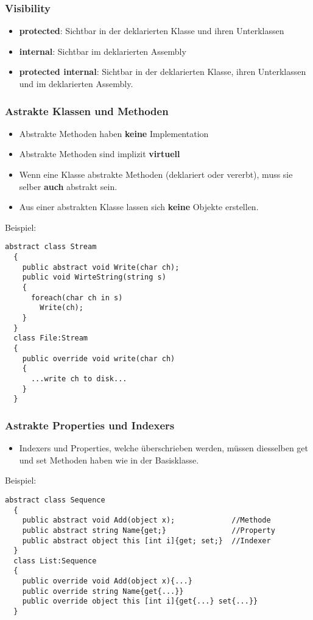 \subsubsection{Visibility}
\begin{itemize}
  \item \textbf{protected}: Sichtbar in der deklarierten Klasse und ihren
  Unterklassen
  \item \textbf{internal}: Sichtbar im deklarierten Assembly
  \item \textbf{protected internal}: Sichtbar in der deklarierten Klasse, ihren
  Unterklassen und im deklarierten Assembly. 
\end{itemize}

\subsubsection{Astrakte Klassen und Methoden}
\begin{itemize}
  \item Abstrakte Methoden haben \textbf{keine} Implementation
  \item Abstrakte Methoden sind implizit \textbf{virtuell}
  \item Wenn eine Klasse abstrakte Methoden (deklariert oder vererbt), muss sie
  selber \textbf{auch} abstrakt sein. 
  \item Aus einer abstrakten Klasse lassen sich \textbf{keine} Objekte
  erstellen. 
\end{itemize}
Beispiel: 
\begin{lstlisting}[style=Csharp]
  abstract class Stream
  {
    public abstract void Write(char ch);
    public void WirteString(string s)
    {
      foreach(char ch in s) 
        Write(ch); 
    }
  }
  class File:Stream
  {
    public override void write(char ch)
    {
      ...write ch to disk...
    }
  }
\end{lstlisting}

\subsubsection{Astrakte Properties und Indexers}
\begin{itemize}
  \item Indexers und Properties, welche überschrieben werden, müssen diesselben
  get und set Methoden haben wie in der Basisklasse.
\end{itemize}
Beispiel: 
\begin{lstlisting}[style=Csharp]
  abstract class Sequence
  {
    public abstract void Add(object x);             //Methode
    public abstract string Name{get;}               //Property
    public abstract object this [int i]{get; set;}  //Indexer   
  }
  class List:Sequence
  {
    public override void Add(object x){...}
    public override string Name{get{...}}
    public override object this [int i]{get{...} set{...}}
  }
\end{lstlisting}


